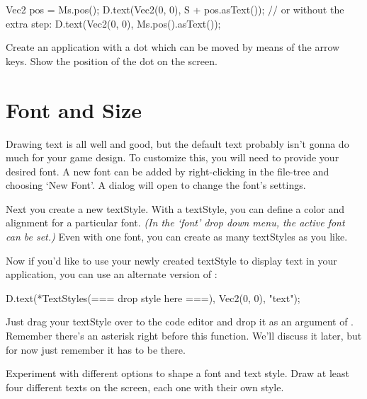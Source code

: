 \begin{code}
Vec2 pos = Ms.pos();
D.text(Vec2(0, 0), S + pos.asText());
// or without the extra step:
D.text(Vec2(0, 0), Ms.pos().asText());
\end{code}

\begin{exercise}
Create an application with a dot which can be moved by means of the arrow keys. Show the position of the dot on the screen.
\end{exercise}

\section{Font and Size}
\label{chapter:tekstopmaak}
Drawing text is all well and good, but the default text probably isn't gonna do much for your game design. To customize this, you will need to provide your desired font. A new font can be added by right-clicking in the file-tree and choosing `New Font'. A dialog will open to change the font's settings.

Next you create a new textStyle. With a textStyle, you can define a color and alignment for a particular font. \textsl{(In the `font' drop down menu, the active font can be set.)} Even with one font, you can create as many textStyles as you like.

Now if you'd like to use your newly created textStyle to display text in your application, you can use an alternate version of  :

\begin{code}
D.text(*TextStyles(=== drop style here ===), Vec2(0, 0), "text");
\end{code}

Just drag your textStyle over to the code editor and drop it as an argument of . Remember there's an asterisk right before this function. We'll discuss it later, but for now just remember it has to be there.

\begin{exercise}
Experiment with different options to shape a font and text style. Draw at least four different texts on the screen, each one with their own style.
\end{exercise}